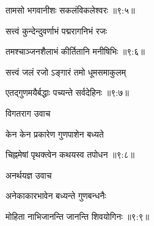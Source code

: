 
{\devanagarifont तामसो भगवानीशः सकलंविकलेश्वरः {॥९:५॥} \veg\dontdisplaylinenum }%

\vfill
\pageparbreak
\vers

{\devanagarifont सत्त्वं कुन्देन्दुवर्णाभं पद्मरागनिभं रजः \thinspace{\dandab} \dontdisplaylinenum }%


{\devanagarifont तमश्चाञ्जनशैलाभं कीर्तितानि मनीषिभिः {॥९:६॥} \veg\dontdisplaylinenum }%

{\devanagarifont सत्त्वं जलं रजो ऽङ्गारं तमो धूमसमाकुलम् \thinspace{\dandab} \dontdisplaylinenum }%


{\devanagarifont एतद्गुणमयैर्बद्धाः पच्यन्ते सर्वदेहिनः {॥९:७॥} \veg\dontdisplaylinenum }%

{\devanagarifont विगतराग उवाच {\dandab}\dontdisplaylinenum  }%
 
{\devanagarifont केन केन प्रकारेण गुणपाशेन बध्यते \thinspace{\danda} \dontdisplaylinenum }%


{\devanagarifont चिह्नमेषां पृथक्त्वेन कथयस्व तपोधन {॥९:८॥} \veg\dontdisplaylinenum }%

{\devanagarifont अनर्थयज्ञ उवाच {\dandab}\dontdisplaylinenum  }%
 
{\devanagarifont अनेकाकारभावेन बध्यन्ते गुणबन्धनैः \thinspace{\danda} \dontdisplaylinenum }%
 

{\devanagarifont मोहिता नाभिजानन्ति जानन्ति शिवयोगिनः {॥९:९॥} \veg\dontdisplaylinenum }%

